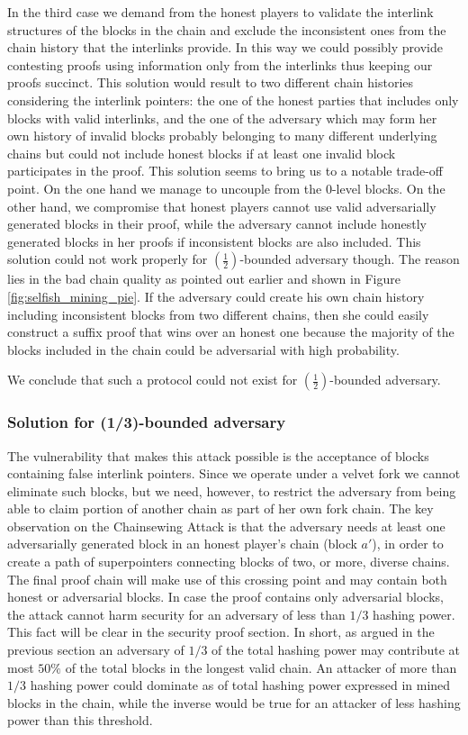 In the third case we demand from the honest players to validate the interlink
structures of the blocks in the chain and exclude the inconsistent ones from
the chain history that the interlinks provide. In this way we could possibly
provide contesting proofs using information only from the interlinks thus
keeping our proofs succinct. This solution would result to two different
chain histories considering the interlink pointers: the one of the honest
parties that includes only blocks with valid interlinks, and the one of the
adversary which may form her own history of invalid blocks probably belonging
to many different underlying chains but could not include honest blocks if at
least one invalid block participates in the proof. This solution seems to bring
us to a notable trade-off point. On the one hand we manage to uncouple from the
0-level blocks. On the other hand, we compromise that honest players cannot use
valid adversarially generated blocks in their proof, while the adversary cannot
include honestly generated blocks in her proofs if inconsistent blocks are also
included. This solution could not work properly for $(\frac{1}{2})$-bounded adversary
though. The reason lies in the bad chain quality as pointed out earlier and shown in
Figure \ref{fig:selfish_mining_pie}. If the adversary  could create his own chain
history including inconsistent blocks from two different chains, then she could
easily construct a suffix proof that wins over an honest one because the majority
of the blocks included in the chain could be adversarial with high probability.

We conclude that such a protocol could not exist for $(\frac{1}{2})$-bounded adversary.


\subsubsection*{Solution for (1/3)-bounded adversary}
The vulnerability that makes this attack possible is the acceptance of blocks
containing false interlink pointers. Since we operate under a velvet fork we
cannot eliminate such blocks, but we need, however, to restrict the adversary
from being able to claim portion of another chain as part of her own fork chain.
The key observation on the Chainsewing Attack is that the adversary needs at
least one adversarially generated block in an honest player's chain (block $a'$),
in order to create a path of superpointers connecting blocks of two, or more,
diverse chains. The final proof chain will make use of this crossing point and
may contain both honest or adversarial blocks.
In case the proof contains only adversarial blocks, the attack cannot harm
security for an adversary of less than $1/3$ hashing power. This fact will be
clear in the security proof section. In short, as argued in the previous section
an adversary of $1/3$ of the total hashing power may contribute at most $ 50\% $
of the total blocks in the longest valid chain. An attacker of more than $1/3$
hashing power could dominate as of total hashing power expressed in mined blocks
in the chain, while the inverse would be true for an attacker of less hashing power
than this threshold.

